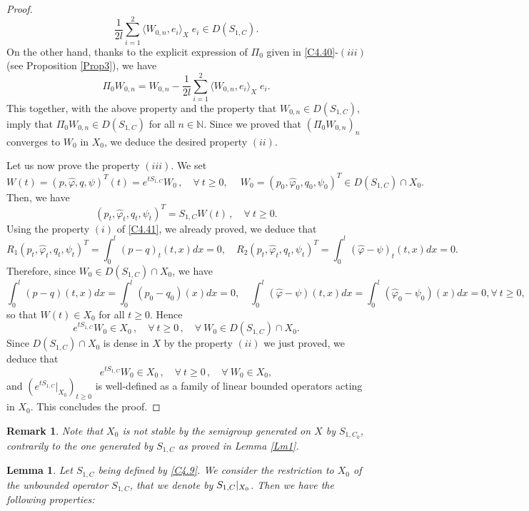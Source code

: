 \documentclass[10pt, english]{article}
\newtheorem{lem}[thm]{Lemma}
\newtheorem{oss}[thm]{Remark}
\begin{document}
{\begin{proof}
$$
\displaystyle{\dfrac{1}{2l}\sum_{i=1}^2\langle W_{0,n},e_i\rangle_X \;e_i  \in D(S_{1,C})}.
$$
On the other hand, thanks to the explicit expression of $\Pi_0$ given in \eqref{C4.40}-$(iii)$ (see Proposition \ref{Prop3}), we have
$$
\Pi_0 W_{0,n}=W_{0,n}- \displaystyle{\dfrac{1}{2l}\sum_{i=1}^2\langle W_{0,n},e_i\rangle_X \;e_i 
}.
$$
This together, with the above property and the property that $W_{0,n} \in D(S_{1,C})$, imply that $\Pi_0 W_{0,n} \in D(S_{1,C})$ for all $n \in \mathbb{N}$. Since we proved that $(\Pi_0W_{0,n})_n$ converges to $W_0$ in $X_0$, we deduce the desired property $(ii)$.

Let us now prove the property $(iii)$.
We set
$$
W(t)=(p,\widehat{\varphi},q,\psi)^T(t)=e^{tS_{1,C}}W_0\,, \quad \forall \ t \geqslant 0, \quad \ W_0=(p_0,\widehat{\varphi}_0,q_0,\psi_0)^T \in D(S_{1,C})\cap X_0.
$$
Then, we have
$$
(p_t,\widehat{\varphi}_t,q_t,\psi_t)^T=S_{1,C}W(t) \,, \quad \forall \ t \geqslant 0.
$$
Using the property $(i)$ of \eqref{C4.41}, we already proved, we deduce that
$$
R_1(p_t,\widehat{\varphi}_t,q_t,\psi_t)^T=\int_0^l(p-q)_t(t,x)dx=0, \quad R_2(p_t,\widehat{\varphi}_t,q_t,\psi_t)^T=\int_0^l(\widehat{\varphi}-\psi)_t(t,x)dx=0.
$$
Therefore, since $W_0 \in D(S_{1,C})\cap X_0$, we have
$$
\int_0^l(p-q)(t,x)dx=\int_0^l(p_0-q_0)(x)dx=0, \quad \int_0^l(\widehat{\varphi}-\psi)(t,x)dx=\int_0^l(\widehat{\varphi}_0-\psi_0)(x)dx=0,
\forall \ t \geqslant 0,$$
so that $W(t) \in X_0$ for all $t \geqslant 0$. 
Hence 
$$
e^{tS_{1,C}}W_0 \in X_0\,, \quad \forall \ t \geqslant 0\,, \quad \forall \ W_0 \in D(S_{1,C})\cap X_0.
$$
Since $D(S_{1,C})\cap X_0 $ is dense in $X$ by the property $(ii)$ we just proved, we deduce that
$$
e^{tS_{1,C}}W_0 \in X_0\,, \quad \forall \ t \geqslant 0\,, \quad \forall \ W_0 \in X_0,
$$
and $(e^{tS_{1,C}}|_{X_0})_{t\geqslant 0}$ is well-defined as a family of linear bounded operators acting in $X_0$. This concludes the proof.
\end{proof}

\begin{oss}\label{S1C_0notX_0stable}
Note that $X_0$ is not stable by the semigroup generated on $X$ by $S_{1,C_0}$, contrarily to the one generated by $S_{1,C}$ as proved in Lemma \ref{Lm1}.
\end{oss}

\begin{lem}\label{Lm2}
Let $S_{1,C}$ being defined by \eqref{C4.9}. We consider the restriction to $X_0$ of the unbounded operator $S_{1,C}$, that we denote by $S_{1,C}\small{|}_{X_0}$. Then we have the following properties:


\end{lem}}
\end{document}
